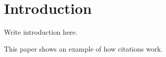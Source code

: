 \section{Introduction}

Write introduction here.

This paper \cite{bahtaLivestockSectorTransformation2023} shows an example of how citations work.

